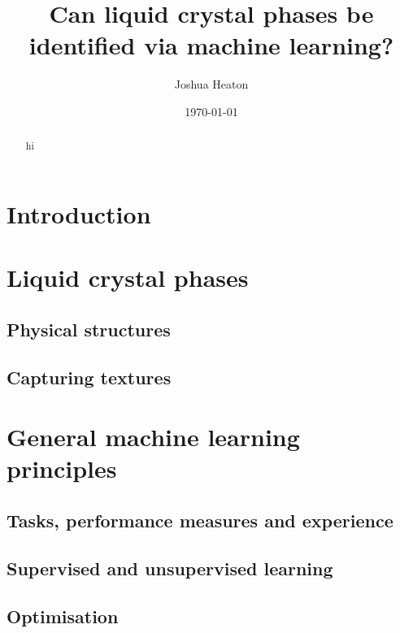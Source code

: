 \documentclass[12pt]{article}
\begin{document}
\title{Can liquid crystal phases be identified via machine learning?}
\author{Joshua Heaton}
\date{\today}

\maketitle

\begin{abstract}
hi
\end{abstract}

\section{Introduction}

\section{Liquid crystal phases}

\subsection{Physical structures}

\subsection{Capturing textures}

\section{General machine learning principles}

\subsection{Tasks, performance measures and experience}

\subsection{Supervised and unsupervised learning}

\subsection{Optimisation}
\end{document}
